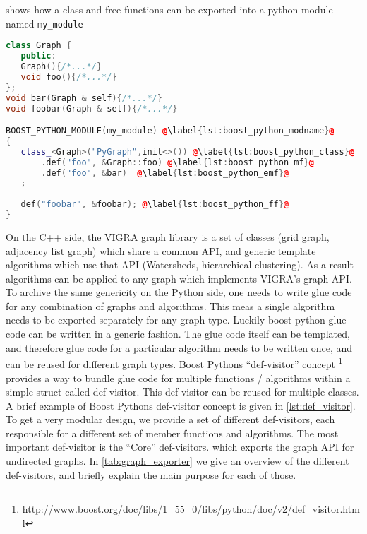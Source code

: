  shows how a  class and free functions can
be exported into a python module named \lstinline{my_module}

\vspace{0.3cm}
\begin{lstlisting}[language=c++]
class Graph {
   public:
   Graph(){/*...*/}
   void foo(){/*...*/}
};
void bar(Graph & self){/*...*/}
void foobar(Graph & self){/*...*/}

BOOST_PYTHON_MODULE(my_module) @\label{lst:boost_python_modname}@
{   
   class_<Graph>("PyGraph",init<>()) @\label{lst:boost_python_class}@
       .def("foo", &Graph::foo) @\label{lst:boost_python_mf}@
       .def("foo", &bar)  @\label{lst:boost_python_emf}@
   ;                                      
   
   def("foobar", &foobar); @\label{lst:boost_python_ff}@
}
\end{lstlisting}
\vspace{-1.4cm}

On the C++ side, the VIGRA graph library is a set of classes (\ie grid graph, adjacency list graph) 
which share a common API, 
and generic template algorithms which use that API (\ie Watersheds, hierarchical clustering).
As a result algorithms can be applied to any graph which implements VIGRA's graph API.
To archive the same genericity on the Python side, one
needs to write glue code for any combination of graphs and algorithms.
This meas a single algorithm needs to be exported separately for any
graph type. 
Luckily boost python glue code can be written in a generic fashion.
The glue code itself can be templated, and therefore 
glue code for a particular algorithm needs to be written once, 
and can be reused for different graph types.
Boost Pythons ``def-visitor'' concept \footnote{\url{http://www.boost.org/doc/libs/1_55_0/libs/python/doc/v2/def_visitor.html}}
provides a way to bundle glue code for multiple functions / algorithms within a simple struct called def-visitor.
This def-visitor can be reused for multiple classes.
A brief example of Boost Pythons def-visitor concept is given in \cref{lst:def_visitor}.
To get a very modular design, we provide a set of different def-visitors,
each responsible for a different set of member functions and algorithms.
The most important def-visitor is the ``Core'' def-visitors.
which exports the graph API for undirected graphs.
In \cref{tab:graph_exporter} we give an overview of 
the different def-visitors, and briefly explain the main purpose
for each of those.

